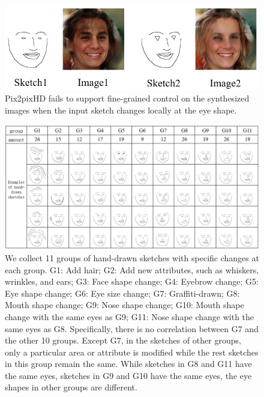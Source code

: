 \documentclass[10pt,twocolumn,letterpaper]{article}
\begin{document}
\begin{figure}
	\centering
	\includegraphics[width=\columnwidth]{figures/prob-in-pix2pixHD.png}
	\caption{Pix2pixHD fails to support fine-grained control on the synthesized images when the input sketch changes locally at the eye shape.}
	\label{fig:problem-in}
\end{figure}


\begin{figure}[htbp]
	\centering
	\includegraphics[width=\textwidth]{hand_drawn_sketches.png}
	\caption{We collect 11 groups of hand-drawn sketches with specific changes at each group. G1: Add hair; G2: Add new attributes, such as whiskers, wrinkles, and ears; G3: Face shape change; G4: Eyebrow change; G5: Eye shape change; G6: Eye size change; G7: Graffiti-drawn; G8: Mouth shape change; G9: Nose shape change; G10: Mouth shape change with the same eyes as G9; G11: Nose shape change with the same eyes as G8. Specifically, there is no correlation between G7 and the other 10 groups. Except G7, in the sketches of other groups, only a particular area or attribute is modified while the rest sketches in this group remain the same. While sketches in G8 and G11 have the same eyes, sketches in G9 and G10 have the same eyes, the eye shapes in other groups are different.}
	\label{fig:hand_drawn_contours}
\end{figure}
\end{document}
